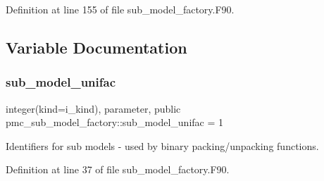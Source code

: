 Definition at line 155 of file sub\+\_\+model\+\_\+factory.\+F90.



\subsection{Variable Documentation}
\mbox{\label{namespacepmc__sub__model__factory_ad127121ccbf7246c2d39c3d94349b116}} 
\subsubsection{\texorpdfstring{sub\+\_\+model\+\_\+unifac}{sub\_model\_unifac}}
{\footnotesize\ttfamily integer(kind=i\+\_\+kind), parameter, public pmc\+\_\+sub\+\_\+model\+\_\+factory\+::sub\+\_\+model\+\_\+unifac = 1}



Identifiers for sub models -\/ used by binary packing/unpacking functions. 



Definition at line 37 of file sub\+\_\+model\+\_\+factory.\+F90.

